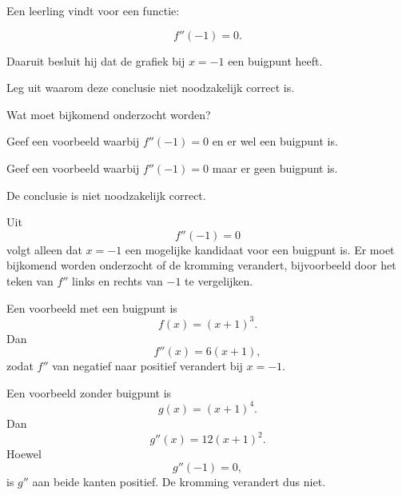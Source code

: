 \documentclass{ximera}
\begin{document}
\begin{oefening}{\oefU\ESS}

Een leerling vindt voor een functie:

\[
f''(-1)=0.
\]

Daaruit besluit hij dat de grafiek bij $x=-1$ een buigpunt heeft.

\begin{question}
Leg uit waarom deze conclusie niet noodzakelijk correct is.
\end{question}

\begin{question}
Wat moet bijkomend onderzocht worden?
\end{question}

\begin{question}
Geef een voorbeeld waarbij $f''(-1)=0$ en er wel een buigpunt is.
\end{question}

\begin{question}
Geef een voorbeeld waarbij $f''(-1)=0$ maar er geen buigpunt is.
\end{question}

\begin{oplossing}

De conclusie is niet noodzakelijk correct.

Uit
\[
f''(-1)=0
\]
volgt alleen dat $x=-1$ een mogelijke kandidaat voor een buigpunt is.
Er moet bijkomend worden onderzocht of de kromming verandert, bijvoorbeeld
door het teken van $f''$ links en rechts van $-1$ te vergelijken.

Een voorbeeld met een buigpunt is
\[
f(x)=(x+1)^3.
\]
Dan
\[
f''(x)=6(x+1),
\]
zodat $f''$ van negatief naar positief verandert bij $x=-1$.

Een voorbeeld zonder buigpunt is
\[
g(x)=(x+1)^4.
\]
Dan
\[
g''(x)=12(x+1)^2.
\]
Hoewel
\[
g''(-1)=0,
\]
is $g''$ aan beide kanten positief. De kromming verandert dus niet.

\end{oplossing}

\end{oefening}


\end{document}
